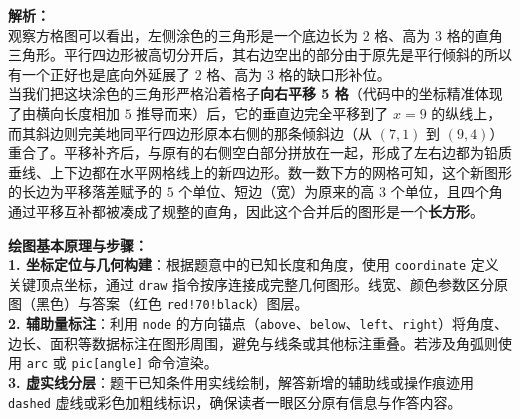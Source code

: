 \documentclass[12pt, a4paper]{ctexrep}
\begin{document}
\begin{center}
\end{center}

\vspace{0.6cm}
{\small\color{gray}
\textbf{解析：}\\
观察方格图可以看出，左侧涂色的三角形是一个底边长为 $2$ 格、高为 $3$ 格的直角三角形。平行四边形被高切分开后，其右边空出的部分由于原先是平行倾斜的所以有一个正好也是底向外延展了 $2$ 格、高为 $3$ 格的缺口形补位。\\
当我们把这块涂色的三角形严格沿着格子\textbf{向右平移 5 格}（代码中的坐标精准体现了由横向长度相加 $5$ 推导而来）后，它的垂直边完全平移到了 $x=9$ 的纵线上，而其斜边则完美地同平行四边形原本右侧的那条倾斜边（从 $(7,1)$ 到 $(9,4)$）重合了。平移补齐后，与原有的右侧空白部分拼放在一起，形成了左右边都为铅质垂线、上下边都在水平网格线上的新四边形。数一数下方的网格可知，这个新图形的长边为平移落差赋予的 $5$ 个单位、短边（宽）为原来的高 $3$ 个单位，且四个角通过平移互补都被凑成了规整的直角，因此这个合并后的图形是一个\textbf{长方形}。
}


\vspace{0.6cm}

{\small\color{blue!70!black}
\textbf{绘图基本原理与步骤：}\\
\textbf{1. 坐标定位与几何构建}：根据题意中的已知长度和角度，使用 \texttt{coordinate} 定义关键顶点坐标，通过 \texttt{draw} 指令按序连接成完整几何图形。线宽、颜色参数区分原图（黑色）与答案（红色 \texttt{red!70!black}）图层。\\
\textbf{2. 辅助量标注}：利用 \texttt{node} 的方向锚点（\texttt{above}、\texttt{below}、\texttt{left}、\texttt{right}）将角度、边长、面积等数据标注在图形周围，避免与线条或其他标注重叠。若涉及角弧则使用 \texttt{arc} 或 \texttt{pic[angle]} 命令渲染。\\
\textbf{3. 虚实线分层}：题干已知条件用实线绘制，解答新增的辅助线或操作痕迹用 \texttt{dashed} 虚线或彩色加粗线标识，确保读者一眼区分原有信息与作答内容。
}
\end{document}
